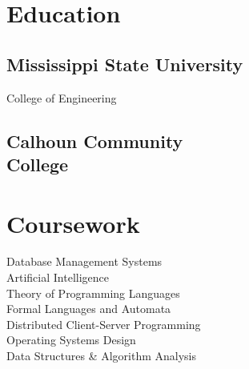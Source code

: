 \documentclass[]{hawkins-resume}
\begin{document}
\begin{minipage}[t]{0.33\textwidth}

\section{Education}

\subsection{Mississippi State University}
College of Engineering \\

\sectionsep

\subsection[Calhoun Community College]{\texorpdfstring{Calhoun Community\\ College}{Calhoun Community College}}

\sectionsep

\section{Coursework}
Database Management Systems \\
Artificial Intelligence \\
Theory of Programming Languages \\
Formal Languages and Automata \\
Distributed Client-Server Programming \\
Operating Systems Design \\
Data Structures \& Algorithm Analysis \\


\end{minipage}
\end{document}
